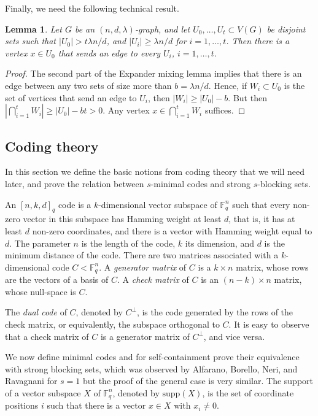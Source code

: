 \documentclass[11pt]{article}
\theoremstyle{plain}
\newtheorem{lemma}[theorem]{Lemma}
\theoremstyle{definition}
\begin{document}
\noindent
Finally, we need the following technical result.

\begin{lemma}\label{lemma:star}
Let $G$ be an $(n,d,\lambda)$-graph, and let $U_0,\dots,U_{t}\subset V(G)$ be disjoint sets such that $|U_0|> t\lambda n /d$, and $|U_i|\geq \lambda n/d$ for $i=1,\dots,t$. Then there is a vertex $x\in U_0$ that sends an edge to every $U_i$, $i=1,\dots,t$.
\end{lemma}

\begin{proof}
The second part of the Expander mixing lemma implies that there is an edge between any two sets of size more than $b=\lambda n/d$. Hence, if $W_i\subset U_0$ is the set of vertices that send an edge to $U_i$, then $|W_i|\geq |U_0|-b$. But then $|\bigcap_{i=1}^t W_i|\geq |U_0|-bt>0$. Any vertex $x\in \bigcap_{i=1}^t W_i$ suffices.
\end{proof}

\subsection{Coding theory}\label{sec:coding_background}
In this section we define the basic notions from coding theory that we will need later, and prove the relation between $s$-minimal codes and strong $s$-blocking sets. 

An $[n, k, d]_q$ code is a $k$-dimensional vector subspace of $\mathbb{F}_q^n$ such that every non-zero vector in this subspace has Hamming weight at least $d$, that is, it has at least $d$ non-zero coordinates, and there is a vector with Hamming weight equal to $d$. 
The parameter $n$ is the length of the code, $k$ its dimension, and $d$ is the minimum distance of the code. 
There are two matrices associated with a $k$-dimensional code $C<\mathbb{F}_q^n$. A \emph{generator matrix} of $C$ is a $k\times n$ matrix, whose rows are the vectors of a basis of $C$. A \emph{check matrix} of $C$ is an $(n-k)\times n$ matrix, whose null-space is $C$.

The \emph{dual code} of $C$, denoted by $C^{\perp}$, is the code generated by the rows of the check matrix, or equivalently, the subspace orthogonal to $C$. It is easy to observe that a check matrix of $C$ is a generator matrix of $C^{\perp}$, and vice versa.


We now define minimal codes and for self-containment prove their equivalence with strong blocking sets, which was observed by Alfarano, Borello,  Neri, and  Ravagnani \cite{ABNR} for $s = 1$ but the proof of the general case is very similar. 
The support of a vector subspace $X$ of $\mathbb{F}_q^n$, denoted by $\mathrm{supp}(X)$, is the set of coordinate positions $i$ such that there is a vector $x \in X$ with $x_i \neq 0$.
\end{document}

